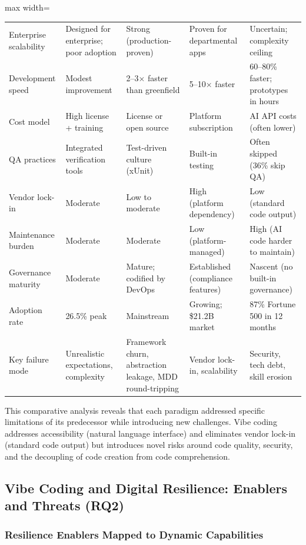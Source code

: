 \documentclass[preprint,12pt,authoryear]{elsarticle}
\begin{document}
\begin{table}[htbp]
\begin{adjustbox}{max width=\textwidth}
\begin{tabular}{@{}p{2.4cm}p{2.9cm}p{3.4cm}p{3.0cm}p{3.2cm}@{}}
Enterprise scalability & Designed for enterprise; poor adoption & Strong (production-proven) & Proven for departmental apps & Uncertain; complexity ceiling \\
Development speed & Modest improvement & 2--3$\times$ faster than greenfield & 5--10$\times$ faster & 60--80\% faster; prototypes in hours \\
Cost model & High license + training & License or open source & Platform subscription & AI API costs (often lower) \\
QA practices & Integrated verification tools & Test-driven culture (xUnit) & Built-in testing & Often skipped (36\% skip QA) \\
Vendor lock-in & Moderate & Low to moderate & High (platform dependency) & Low (standard code output) \\
Maintenance burden & Moderate & Moderate & Low (platform-managed) & High (AI code harder to maintain) \\
Governance maturity & Moderate & Mature; codified by DevOps & Established (compliance features) & Nascent (no built-in governance) \\
Adoption rate & 26.5\% peak & Mainstream & Growing; \$21.2B market & 87\% Fortune 500 in 12 months \\
Key failure mode & Unrealistic expectations, complexity & Framework churn, abstraction leakage, MDD round-tripping & Vendor lock-in, scalability & Security, tech debt, skill erosion \\
\bottomrule
\end{tabular}
\end{adjustbox}
\end{table}

This comparative analysis reveals that each paradigm addressed specific limitations of its predecessor while introducing new challenges. Vibe coding addresses accessibility (natural language interface) and eliminates vendor lock-in (standard code output) but introduces novel risks around code quality, security, and the decoupling of code creation from code comprehension.


\subsection{Vibe Coding and Digital Resilience: Enablers and Threats (RQ2)}
\label{sec:RQ2}

\subsubsection{Resilience Enablers Mapped to Dynamic Capabilities}
\end{document}
